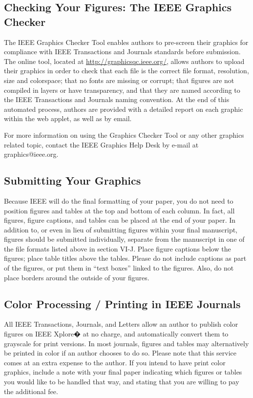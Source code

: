 \documentclass[journal]{IEEEtranTIE}
\begin{document}
\subsection{Checking Your Figures: The IEEE Graphics Checker}
The IEEE Graphics Checker Tool enables authors to pre-screen their graphics for compliance with IEEE Transactions and Journals standards before submission. The online tool, located at \url{http://graphicsqc.ieee.org/}, allows authors to upload their graphics in order to check that each file is the correct file format, resolution, size and colorspace; that no fonts are missing or corrupt; that figures are not compiled in layers or have transparency, and that they are named according to the IEEE Transactions and Journals naming convention. At the end of this automated process, authors are provided with a detailed report on each graphic within the web applet, as well as by email.

For more information on using the Graphics Checker Tool or any other graphics related topic, contact the IEEE Graphics Help Desk by e-mail at graphics@ieee.org.

\subsection{Submitting Your Graphics}
Because IEEE will do the final formatting of your paper, you do not need to position figures and tables at the top and bottom of each column. In fact, all figures, figure captions, and tables can be placed at the end of your paper. In addition to, or even in lieu of submitting figures within your final manuscript, figures should be submitted individually, separate from the manuscript in one of the file formats listed above in section VI-J. Place figure captions below the figures; place table titles above the tables. Please do not include captions as part of the figures, or put them in ``text boxes'' linked to the figures. Also, do not place borders around the outside of your figures.

\subsection{Color Processing / Printing in IEEE Journals}
All IEEE Transactions, Journals, and Letters allow an author to publish color figures on IEEE Xplore� at no charge, and automatically convert them to grayscale for print versions. In most journals, figures and tables may alternatively be printed in color if an author chooses to do so. Please note that this service comes at an extra expense to the author. If you intend to have print color graphics, include a note with your final paper indicating which figures or tables you would like to be handled that way, and stating that you are willing to pay the additional fee.
\end{document}
